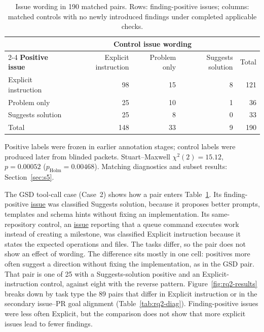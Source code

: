 \documentclass[acmsmall,screen,nonacm]{acmart}
\begin{document}
\begin{table}[!tbp]
\caption{Issue wording in 190 matched pairs. Rows: finding-positive issues; columns: matched controls with no newly introduced findings under completed applicable checks.}
\label{tab:rq2}
\small
\begin{tabular}{@{}lrrrr@{}}
\toprule
& \multicolumn{3}{c}{\textbf{Control issue wording}} & \\
\cmidrule(lr){2-4}
\textbf{Positive issue} & Explicit instruction & Problem only & Suggests solution & Total\\
\midrule
Explicit instruction & 98 & 15 & 8 & 121\\
Problem only & 25 & 10 & 1 & 36\\
Suggests solution & 25 & 8 & 0 & 33\\
\midrule
Total & 148 & 33 & 9 & 190\\
\bottomrule
\end{tabular}
\par\smallskip\raggedright\footnotesize Positive labels were frozen in earlier annotation stages; control labels were produced later from blinded packets. Stuart--Maxwell $\chi^2(2)=15.12$, $p=0.00052$ ($p_{\mathrm{Holm}}=0.00468$). Matching diagnostics and subset results: Section~\ref{sec:s5}.
\end{table}

The GSD tool-call case (Case~2) shows how a pair enters Table~\ref{tab:rq2}. Its finding-positive \href{https://github.com/gsd-build/gsd-2/issues/2660}{issue} was classified Suggests solution, because it proposes better prompts, templates and schema hints without fixing an implementation. Its same-repository control, an \href{https://github.com/gsd-build/gsd-2/issues/2545}{issue} reporting that a queue command executes work instead of creating a milestone, was classified Explicit instruction because it states the expected operations and files. The tasks differ, so the pair does not show an effect of wording. The difference sits mostly in one cell: positives more often suggest a direction without fixing the implementation, as in the GSD pair. That pair is one of 25 with a Suggests-solution positive and an Explicit-instruction control, against eight with the reverse pattern. Figure~\ref{fig:rq2-results} breaks down by task type the 89 pairs that differ in Explicit instruction or in the secondary issue--PR goal alignment (Table~\ref{tab:rq2-diag}). Finding-positive issues were less often Explicit, but the comparison does not show that more explicit issues lead to fewer findings.
\end{document}

